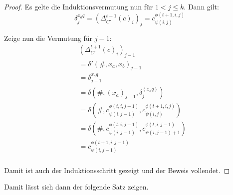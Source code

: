 \begin{proof}
    Es gelte die Induktionsvermutung nun für $1 < j \leq k$. Dann gilt:
    \[
    \delta^{x_a q}_j = (\Delta^{t+1}_{C'}(c)_i)_j = c^{\phi(t + 1, i, j)}_{\psi(i, j)}
    \]
    
    Zeige nun die Vermutung für $j-1$:
    \begin{align*}
        & (\Delta^{t+1}_{C'}(c)_i)_{j-1} \\
        & = \delta'(\#, x_a, x_b)_{j-1} \\
        & = \delta^{x_a q}_{j-1} \\
        & = \delta(\#, (x_a)_{j-1}, \delta^{(x_a q)}_j) \\
        & = \delta(\#, c^{\phi(t, i, j-1)}_{\psi(i, j-1)}, c^{\phi(t + 1, i, j)}_{\psi(i, j)}) \\
        & = \delta(\#, c^{\phi(t, i, j-1)}_{\psi(i, j-1)}, c^{\phi(t, i, j-1)}_{\psi(i, j-1)+1}) \\
        & = c^{\phi(t + 1, i, j-1)}_{\psi(i, j - 1)} \\
    \end{align*}
    
    Damit ist auch der Induktionsschritt gezeigt und der Beweis vollendet.
\end{proof}

Damit lässt sich dann der folgende Satz zeigen.

